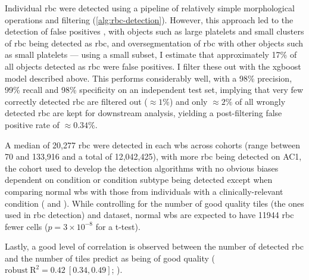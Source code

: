 Individual \ac{rbc} were detected using a pipeline of relatively simple morphological operations and filtering (\ref{alg:rbc-detection}). However, this approach led to the detection of false positives , with objects such as large platelets and small clusters of \ac{rbc} being detected as \ac{rbc}, and oversegmentation of \ac{rbc} with other objects such as small platelets --- using a small subset, I estimate that approximately 17\% of all objects detected as \ac{rbc} were false positives. I filter these out with the \ac{xgboost} model described above. This performs considerably well, with a 98\% precision, 99\% recall and 98\% specificity on an independent test set, implying that very few correctly detected \ac{rbc} are filtered out ($\approx 1\%$) and only $\approx 2\%$ of all wrongly detected \ac{rbc} are kept for downstream analysis, yielding a post-filtering false positive rate of $\approx 0.34\%$. 

A median of 20,277 \ac{rbc} were detected in each \ac{wbs} across cohorts (range between 70 and 133,916 and a total of 12,042,425), with more \ac{rbc} being detected on AC1, the cohort used to develop the detection algorithms with no obvious biases dependent on condition or condition subtype being detected except when comparing normal \ac{wbs} with those from individuals with a clinically-relevant condition ( and ). While controlling for the number of good quality tiles (the ones used in \ac{rbc} detection) and dataset, normal \ac{wbs} are expected to have 11944 \ac{rbc} fewer cells ($p=3 \times 10^{-8}$ for a t-test). 

\begin{figure}[!ht]
    \label{fig:rbc-count-coarse}
\end{figure}

\begin{figure}[!ht]
    \label{fig:rbc-count-fine}
\end{figure}

Lastly, a good level of correlation is observed between the number of detected \ac{rbc} and the number of tiles predict as being of good quality ($\mathrm{robust\ R}^2=0.42\ [0.34,0.49]$; ).

